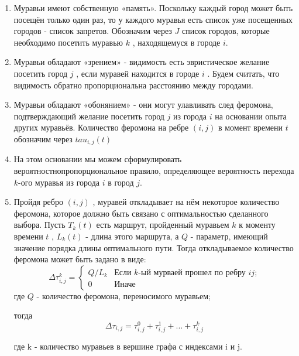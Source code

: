 \documentclass[12pt]{report}
\begin{document}
\begin{enumerate}	
	\item Муравьи имеют собственную «память». Поскольку каждый город может быть посещён только один раз, то у каждого муравья есть список уже посещенных городов - список запретов. Обозначим через $J$ список городов, которые необходимо посетить муравью $k$ , находящемуся в городе $i$. 
	
	\item Муравьи обладают «зрением» - видимость есть эвристическое желание посетить город $j$ , если муравей находится в городе $i$ . Будем считать, что видимость обратно пропорциональна расстоянию между городами. 
	
	\item Муравьи обладают «обонянием» - они могут улавливать след феромона, подтверждающий желание посетить город $j$ из города $i$ на основании опыта других муравьёв. Количество феромона на ребре $(i,j)$ в момент времени $t$ обозначим через  $tau _{i,j} (t)$ 
	
	\item На этом основании мы можем сформулировать вероятностнопропорциональное правило, определяющее вероятность перехода $k$-ого муравья из города $i$  в город $j$. 
	 
	\item Пройдя ребро $(i,j)$ , муравей откладывает на нём некоторое количество феромона, которое должно быть связано с оптимальностью сделанного выбора. Пусть $T _{k} (t)$ есть маршрут, пройденный муравьем $k$ к моменту времени $t$ , $L _{k} (t)$ - длина этого маршрута, а $Q$ - параметр, имеющий значение порядка длины оптимального пути. Тогда откладываемое количество феромона может быть задано в виде:
	  \begin{equation}\label{form:add} 
	 	{\displaystyle \Delta \tau _{i,j}^k={\begin{cases}Q/L_{k}& {\mbox{Если $k$-ый мурваей прошел по ребру $ij$;}}\\0&{\mbox{Иначе}}\end{cases}}}
	 \end{equation}
	 где $Q$ - количество феромона, переносимого муравьем;
	 
	 тогда
	 \begin{equation}\label{form:add1} 
	 	\Delta \tau _{i,j}= \tau _{i,j}^0 + \tau _{i,j}^1 + ... + \tau _{i,j}^k 
	 \end{equation}
	 
	 где k - количество муравьев в вершине графа с индексами i и j.
\end{enumerate}
\end{document}
